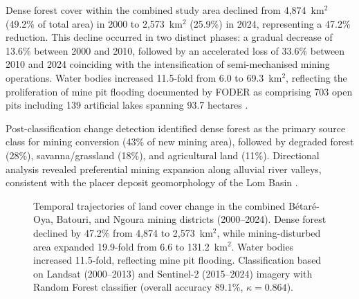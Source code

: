 \documentclass[preprint,12pt,number]{elsarticle}
\begin{document}
Dense forest cover within the combined study area declined from 4,874~km$^{2}$ (49.2\% of total area) in 2000 to 2,573~km$^{2}$ (25.9\%) in 2024, representing a 47.2\% reduction. This decline occurred in two distinct phases: a gradual decrease of 13.6\% between 2000 and 2010, followed by an accelerated loss of 33.6\% between 2010 and 2024 coinciding with the intensification of semi-mechanised mining operations. Water bodies increased 11.5-fold from 6.0 to 69.3~km$^{2}$, reflecting the proliferation of mine pit flooding documented by FODER as comprising 703 open pits including 139 artificial lakes spanning 93.7 hectares \cite{FODER2022}.

Post-classification change detection identified dense forest as the primary source class for mining conversion (43\% of new mining area), followed by degraded forest (28\%), savanna/grassland (18\%), and agricultural land (11\%). Directional analysis revealed preferential mining expansion along alluvial river valleys, consistent with the placer deposit geomorphology of the Lom Basin \cite{Mimba2018}.

\begin{figure}[H]
\centering
{}
\caption{Temporal trajectories of land cover change in the combined B\'{e}tar\'{e}-Oya, Batouri, and Ngoura mining districts (2000--2024). Dense forest declined by 47.2\% from 4,874 to 2,573~km$^{2}$, while mining-disturbed area expanded 19.9-fold from 6.6 to 131.2~km$^{2}$. Water bodies increased 11.5-fold, reflecting mine pit flooding. Classification based on Landsat (2000--2013) and Sentinel-2 (2015--2024) imagery with Random Forest classifier (overall accuracy 89.1\%, $\kappa = 0.864$).}
\label{fig:lulc}
\end{figure}
\end{document}
